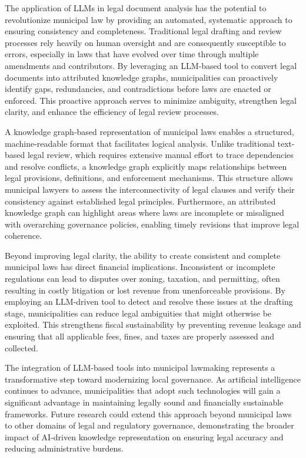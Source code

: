 The application of LLMs in legal document analysis has the potential to revolutionize municipal law by providing an automated, systematic approach to ensuring consistency and completeness. Traditional legal drafting and review processes rely heavily on human oversight and are consequently susceptible to errors, especially in laws that have evolved over time through multiple amendments and contributors. By leveraging an LLM-based tool to convert legal documents into attributed knowledge graphs, municipalities can proactively identify gaps, redundancies, and contradictions before laws are enacted or enforced. This proactive approach serves to minimize ambiguity, strengthen legal clarity, and enhance the efficiency of legal review processes.

A knowledge graph-based representation of municipal laws enables a structured, machine-readable format that facilitates logical analysis. Unlike traditional text-based legal review, which requires extensive manual effort to trace dependencies and resolve conflicts, a knowledge graph explicitly maps relationships between legal provisions, definitions, and enforcement mechanisms. This structure allows municipal lawyers to assess the interconnectivity of legal clauses and verify their consistency against established legal principles. Furthermore, an attributed knowledge graph can highlight areas where laws are incomplete or misaligned with overarching governance policies, enabling timely revisions that improve legal coherence.

Beyond improving legal clarity, the ability to create consistent and complete municipal laws has direct financial implications. Inconsistent or incomplete regulations can lead to disputes over zoning, taxation, and permitting, often resulting in costly litigation or lost revenue from unenforceable provisions. By employing an LLM-driven tool to detect and resolve these issues at the drafting stage, municipalities can reduce legal ambiguities that might otherwise be exploited. This strengthens fiscal sustainability by preventing revenue leakage and ensuring that all applicable fees, fines, and taxes are properly assessed and collected.

The integration of LLM-based tools into municipal lawmaking represents a transformative step toward modernizing local governance. As artificial intelligence continues to advance, municipalities that adopt such technologies will gain a significant advantage in maintaining legally sound and financially sustainable frameworks. Future research could extend this approach beyond municipal laws to other domains of legal and regulatory governance, demonstrating the broader impact of AI-driven knowledge representation on ensuring legal accuracy and reducing administrative burdens.

